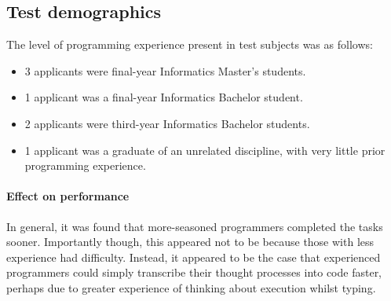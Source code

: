 \subsection{Test demographics}
The level of programming experience present in test subjects was as follows:
\begin{itemize}
    \item 3 applicants were final-year Informatics Master's students.
    \item 1 applicant was a final-year Informatics Bachelor student.
    \item 2 applicants were third-year Informatics Bachelor students.
    \item 1 applicant was a graduate of an unrelated discipline, with very little prior programming experience.
\end{itemize}

\paragraph*{Effect on performance}
In general, it was found that more-seasoned programmers completed the tasks sooner. Importantly though, this appeared not to be because those with less experience had difficulty. Instead, it appeared to be the case that experienced programmers could simply transcribe their thought processes into code faster, perhaps due to greater experience of thinking about execution whilst typing.

